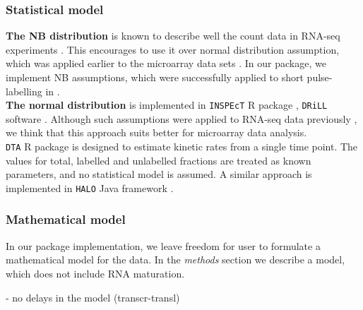 \subsubsection*{Statistical model}
\textbf{The NB distribution} is known to describe well the count data in RNA-seq 
experiments \citep{robinson2007moderated}. This encourages to use it over 
normal distribution assumption, which was applied earlier to the microarray data sets
\citep{miller2011dynamic}. In our package, we implement NB assumptions, which were
successfully applied to short pulse-labelling in \citep{eser2016determinants,
schwalb2016tt}.\\
\textbf{The normal distribution} is implemented in \verb|INSPEcT| R package \citep{de2015inspect},
\verb|DRiLL| software \citep{rabani2014high}. 
Although such assumptions 
were applied to RNA-seq data previously \citep{}, we think that this approach suits better 
for microarray data analysis.\\
\verb|DTA| R package \citep{schwalb2012measurement} is designed to
estimate kinetic rates from a single time point. The values for 
total, labelled and unlabelled fractions are treated as known parameters, and 
no statistical model is assumed. A similar approach is implemented in 
\verb|HALO| Java framework \citep{friedel2010halo}. 

\subsubsection*{Mathematical model}
In our package implementation, we leave freedom for user to formulate a mathematical
model for the data. In the \emph{methods} section we describe a model, which 
does not include RNA maturation.


- no delays in the model (transcr-transl)					



